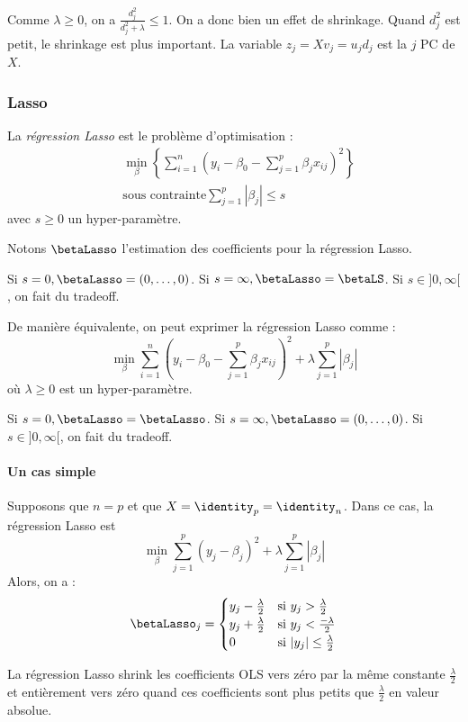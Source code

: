                 Comme \(\lambda \geq 0\), on a \(\frac{d_j^2}{d_j^2 + \lambda} \leq 1\). On a donc bien un effet de shrinkage. Quand \(d_j^2\) est petit, le shrinkage est plus important. La variable \(z_j = X v_j = u_j d_j\) est la \(j\)\ieme{} PC de \(X\).

        \subsubsection{Lasso}
            \begin{definition}
                La \textit{régression Lasso} est le problème d'optimisation :
                \begin{align*}
                    &\min_\beta \left\{\sum_{i=1}^n \left(y_i - \beta_0 - \sum_{j=1}^p \beta_j x_{ij}\right)^2\right\}\\
                    &\text{sous contrainte} \sum_{j=1}^p |\beta_j| \leq s
                \end{align*}
                avec \(s \geq 0\) un hyper-paramètre.

                Notons \(\betaLasso\) l'estimation des coefficients pour la régression Lasso.

                Si \(s = 0, \betaLasso = (0, \dots, 0)\). Si \(s = \infty, \betaLasso = \betaLS\). Si \(s \in ]0, \infty[\), on fait du tradeoff.
            \end{definition}

            \begin{definition}
                De manière équivalente, on peut exprimer la régression Lasso comme :
                \[
                    \min_\beta \sum_{i=1}^n \left(y_i - \beta_0 - \sum_{j=1}^p \beta_j x_{ij}\right)^2 + \lambda \sum_{j=1}^p |\beta_j|
                \]
                où \(\lambda \geq 0\) est un hyper-paramètre.

                Si \(s = 0, \betaLasso = \betaLasso\). Si \(s = \infty, \betaLasso = (0, \dots, 0)\). Si \(s \in ]0, \infty[\), on fait du tradeoff.
            \end{definition}

            \paragraph{Un cas simple}
                Supposons que \(n = p\) et que \(X = \identity_p = \identity_n\). Dans ce cas, la régression Lasso est 
                \[
                     \min_\beta \sum_{j=1}^p (y_j - \beta_j)^2 + \lambda \sum_{j=1}^p |\beta_j|
                \]
                Alors, on a :
                \[
                    \betaLasso_j = \begin{cases}
                        y_j - \frac{\lambda}{2} & \text{si } y_j > \frac{\lambda}{2}\\
                        y_j + \frac{\lambda}{2} & \text{si } y_j < \frac{-\lambda}{2}\\
                        0                       & \text{si } |y_j| \leq \frac{\lambda}{2}
                    \end{cases}
                \]

                La régression Lasso shrink les coefficients OLS vers zéro par la même constante \(\frac{\lambda}{2}\) et entièrement vers zéro quand ces coefficients sont plus petits que \(\frac{\lambda}{2}\) en valeur absolue.
